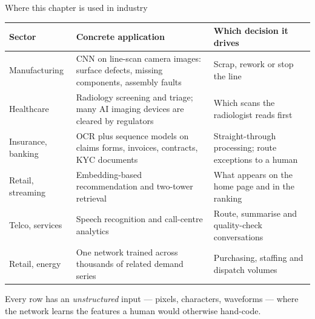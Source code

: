 \documentclass[aspectratio=169,11pt]{beamer}
\begin{document}
\begin{frame}{Where this chapter is used in industry}
  \scriptsize
  \begin{center}
  \begin{tabular}{@{}p{2.5cm}p{5.3cm}p{4.6cm}@{}}
    \toprule
    \textbf{Sector} & \textbf{Concrete application} & \textbf{Which decision it drives} \\
    \midrule
    Manufacturing & CNN on line-scan camera images: surface defects, missing components,
      assembly faults & Scrap, rework or stop the line \\
    Healthcare & Radiology screening and triage; many AI imaging devices are cleared by
      regulators & Which scans the radiologist reads first \\
    Insurance, banking & OCR plus sequence models on claims forms, invoices, contracts,
      KYC documents & Straight-through processing; route exceptions to a human \\
    Retail, streaming & Embedding-based recommendation and two-tower retrieval &
      What appears on the home page and in the ranking \\
    Telco, services & Speech recognition and call-centre analytics &
      Route, summarise and quality-check conversations \\
    Retail, energy & One network trained across thousands of related demand series &
      Purchasing, staffing and dispatch volumes \\
    \bottomrule
  \end{tabular}
  \end{center}
  \begin{industry}
    Every row has an \emph{unstructured} input --- pixels, characters, waveforms --- where
    the network learns the features a human would otherwise hand-code.
  \end{industry}
\end{frame}
\end{document}
